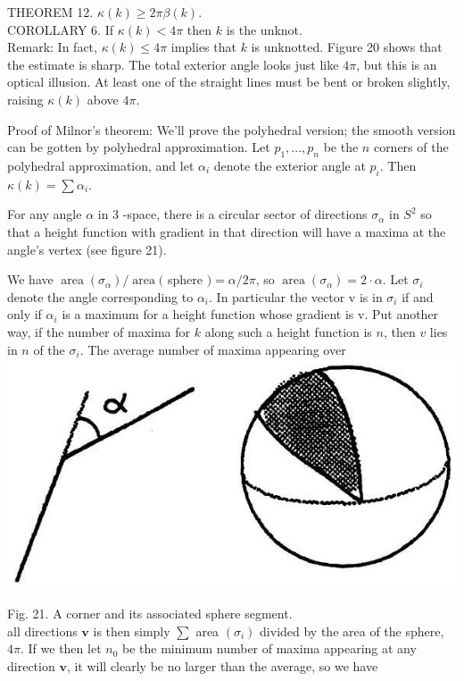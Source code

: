 \documentclass[10pt, letterpaper]{article}
\begin{document}
THEOREM 12. $\kappa(k) \geq 2 \pi \beta(k)$.\\
COROLLARY 6. If $\kappa(k)<4 \pi$ then $k$ is the unknot.\\
Remark: In fact, $\kappa(k) \leq 4 \pi$ implies that $k$ is unknotted. Figure 20 shows that the estimate is sharp. The total exterior angle looks just like $4 \pi$, but this is an optical illusion. At least one of the straight lines must be bent or broken slightly, raising $\kappa(k)$ above $4 \pi$.

Proof of Milnor's theorem: We'll prove the polyhedral version; the smooth version can be gotten by polyhedral approximation. Let $p_{1}, \ldots, p_{n}$ be the $n$ corners of the polyhedral approximation, and let $\alpha_{i}$ denote the exterior angle at $p_{i}$. Then $\kappa(k)=\sum \alpha_{i}$.

For any angle $\alpha$ in 3 -space, there is a circular sector of directions $\sigma_{\alpha}$ in $S^{2}$ so that a height function with gradient in that direction will have a maxima at the angle's vertex (see figure 21).

We have $\operatorname{area}\left(\sigma_{\alpha}\right) / \operatorname{area}($ sphere $)=\alpha / 2 \pi$, so $\operatorname{area}\left(\sigma_{\alpha}\right)=2 \cdot \alpha$. Let $\sigma_{i}$ denote the angle corresponding to $\alpha_{i}$. In particular the vector v is in $\sigma_{i}$ if and only if $\alpha_{i}$ is a maximum for a height function whose gradient is v. Put another way, if the number of maxima for $k$ along such a height function is $n$, then $v$ lies in $n$ of the $\sigma_{i}$. The average number of maxima appearing over\\
\includegraphics[scale=0.2, center]{2025_05_21_037de704f595ce642d3eg-090}

Fig. 21. A corner and its associated sphere segment.\\
all directions $\mathbf{v}$ is then simply $\sum$ area $\left(\sigma_{i}\right)$ divided by the area of the sphere, $4 \pi$. If we then let $n_{0}$ be the minimum number of maxima appearing at any direction $\mathbf{v}$, it will clearly be no larger than the average, so we have
\end{document}
